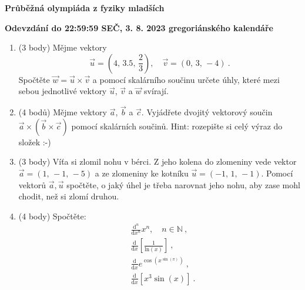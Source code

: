 \documentclass[12pt,a4paper]{article}
\begin{document}
\begin{center}
    \textbf{\Large Průběžná olympiáda z fyziky mladších}
    \vspace{1em}
    
    \textbf{Odevzdání do 22:59:59 SEČ, 3. 8. 2023 gregoriánského kalendáře}
\end{center}
\vspace{1em}

\begin{enumerate}[label=\arabic*)]

\item (3 body) Mějme vektory
\begin{equation*}
    \vec{u} = \left(4,\, 3.5,\, \frac{2}{3}\right),\quad \vec{v} = \left(0,\, 3,\, -4\right) ~.
\end{equation*}
Spočtěte $\vec{w} = \vec{u}\times\vec{v}$ a pomocí skalárního součinu určete úhly, které mezi sebou jednotlivé vektory $\vec{u}$, $\vec{v}$ a $\vec{w}$ svírají.

\item (4 bodů)
Mějme vektory $\vec{a}$, $\vec{b}$ a $\vec{c}$. Vyjádřete dvojitý vektorový součin $\vec{a}\times\left(\vec{b}\times\vec{c}\right)$ pomocí skalárních součinů. Hint: rozepište si celý výraz do složek :-)

\item (3 body)
Víťa si zlomil nohu v bérci. Z jeho kolena do zlomeniny vede vektor $\vec{a} = \left(1,\, -1,\, -5\right)$ a ze zlomeniny ke kotníku $\vec{u} = \left(-1,\, 1,\, -1\right)$. Pomocí vektorů $\vec{a},\vec{u}$ spočtěte, o jaký úhel je třeba narovnat jeho nohu, aby zase mohl chodit, než si zlomí druhou.


\item (4 body) Spočtěte:
\begin{align*}
    &\frac{\mathrm{d}^n}{\mathrm{d}x^n}x^n,\quad n\in\mathbb{N} ~,\\
    &\frac{\mathrm{d}}{\mathrm{d}x}\left[\frac{1}{\mathrm{ln}\left(x\right)}\right] ~,\\
    &\frac{\mathrm{d}}{\mathrm{d}x} e^{\cos\left(x^{\sin\left(\pi\right)}\right)}     ~,\\
    &\frac{\mathrm{d}}{\mathrm{d}x}\left[x^3\sin\left(x\right)\right] ~.
\end{align*}

\end{enumerate}
\end{document}
